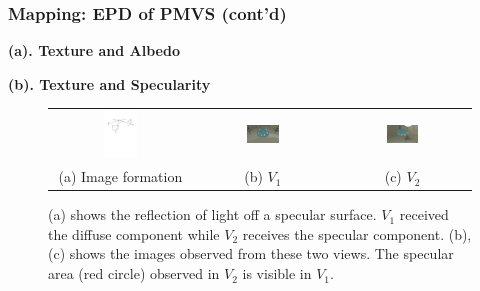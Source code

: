 \documentclass{beamer}
\begin{document}
\begin{frame}
\frametitle{Mapping: EPD of PMVS (cont'd)}

\textbf{(a). Texture and Albedo}

\textbf{(b). Texture and Specularity}
\begin{figure}[!htbp]
\begin{tabular}{ccc}
\includegraphics[width=0.25\textwidth]{mapping/mvs_spec/mvs_spec}&
\includegraphics[width=0.25\textwidth]{mapping/mvs_spec/mvs_spec_01}&
\includegraphics[width=0.25\textwidth]{mapping/mvs_spec/mvs_spec_00}\\
(a) Image formation & (b) $V_1$ & (c) $V_2$\\
\end{tabular}
\caption{(a) shows the reflection of light off a specular surface. $V_1$ received the diffuse component while $V_2$ receives the specular component. (b), (c) shows the images observed from these two views. The specular area (red circle) observed in $V_2$ is visible in $V_1$.}
\end{figure}

\end{frame}
\end{document}
